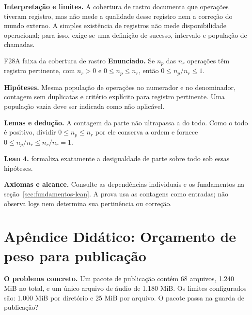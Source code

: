 \begin{descricao}
\textbf{Interpretação e limites.} A cobertura de rastro documenta que operações tiveram registro, mas não mede a qualidade desse registro nem a correção do mundo externo. A simples existência de registros não mede disponibilidade operacional; para isso, exige-se uma definição de sucesso, intervalo e população de chamadas.
\end{descricao}

\clearpage
\begin{formalizacao}{F28}{A faixa da cobertura de rastro}
\textbf{Enunciado.} Se $n_p$ das $n_r$ operações têm registro pertinente,
com $n_r>0$ e $0\leq n_p\leq n_r$, então $0\leq n_p/n_r\leq1$.

\textbf{Hipóteses.} Mesma população de operações no numerador e no
denominador, contagem sem duplicatas e critério explícito para registro
pertinente. Uma população vazia deve ser indicada como não aplicável.

\textbf{Lemas e dedução.} A contagem da parte não ultrapassa a do todo.
Como o todo é positivo, dividir $0\leq n_p\leq n_r$ por ele conserva a
ordem e fornece $0\leq n_p/n_r\leq n_r/n_r=1$.

\textbf{Lean 4.} 
formaliza exatamente a desigualdade de parte sobre todo sob essas hipóteses.

\textbf{Axiomas e alcance.} Consulte as dependências individuais e os
fundamentos na seção~\ref{sec:fundamentos-lean}. A prova usa as contagens
como entradas; não observa logs nem determina sua pertinência ou correção.
\end{formalizacao}

\clearpage

\section{Apêndice Didático: Orçamento de peso para publicação}


\begin{descricao}
\textbf{O problema concreto.} Um pacote de publicação contém 68 arquivos, 1.240 MiB no total, e um único arquivo de áudio de 1.180 MiB. Os limites configurados são: 1.000 MiB por diretório e 25 MiB por arquivo. O pacote passa na guarda de publicação?
\end{descricao}

